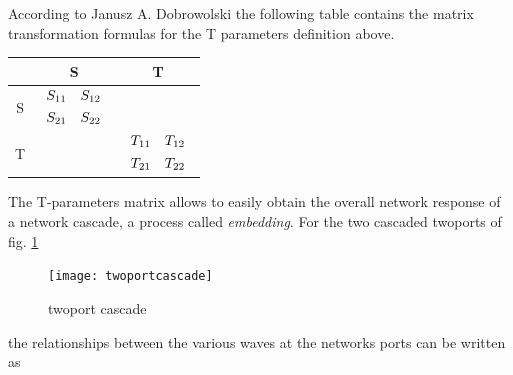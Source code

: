 According to Janusz A. Dobrowolski \cite{Dobrowolski} the following
table contains the matrix transformation formulas for the T parameters definition above.

\addvspace{12pt}

\begin{tabular}{|c|c|c|}
\hline
& S & T\\
\hline
S &
$\begin{array}{cc}S_{11}&S_{12}\vspace{4pt}\\S_{21}&S_{22}\end{array}$ &
\setlength{\fboxrule}{0pt}
\fbox{$\begin{array}{cc}\dfrac{T_{12}}{T_{22}}&\dfrac{\Delta T}{T_{22}}\vspace{4pt}\\\dfrac{1}{T_{22}}&\dfrac{-T_{21}}{T_{22}}\end{array}$}\\
\hline
T &
\setlength{\fboxrule}{0pt}
\fbox{$\begin{array}{cc}\dfrac{-\Delta S}{S_{21}}&\dfrac{S_{11}}{S_{21}}\vspace{4pt}\\\dfrac{-S_{22}}{S_{21}}&\dfrac{1}{S_{21}}\end{array}$} &
$\begin{array}{cc}T_{11}&T_{12}\vspace{4pt}\\T_{21}&T_{22}\end{array}$\\
\hline
\end{tabular}

\addvspace{12pt}

The T-parameters matrix allows to easily obtain the overall network response of a network cascade, a process called \textit{embedding}. For the two cascaded twoports of fig. \ref{fig:twoportcascade}

\begin{figure}[ht]
\begin{center}
\texttt{[image: twoportcascade]}
\end{center}
\caption{twoport cascade}
\label{fig:twoportcascade}
\end{figure}
\FloatBarrier

the relationships between the various waves at the networks ports can be written as

